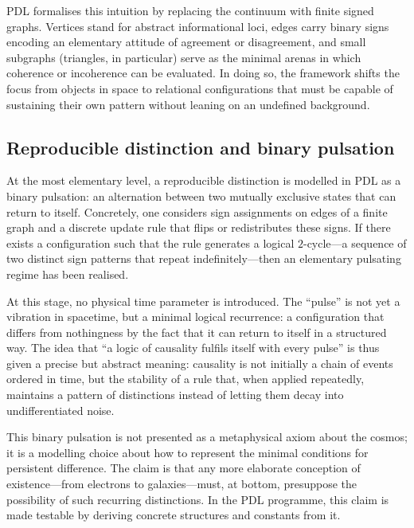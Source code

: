 \documentclass[11pt,a4paper]{article}
\theoremstyle{definition}
\begin{document}
PDL formalises this intuition by replacing the continuum with finite signed graphs. Vertices stand for abstract informational loci, edges carry binary signs encoding an elementary attitude of agreement or disagreement, and small subgraphs (triangles, in particular) serve as the minimal arenas in which coherence or incoherence can be evaluated.\cite{Laubscher_EmergencePhysicalReality_2024,Laubscher_PDL_Position_2024} In doing so, the framework shifts the focus from objects in space to relational configurations that must be capable of sustaining their own pattern without leaning on an undefined background.

\subsection{Reproducible distinction and binary pulsation}

At the most elementary level, a reproducible distinction is modelled in PDL as a binary pulsation: an alternation between two mutually exclusive states that can return to itself.\cite{Laubscher_IntroPDL_2024,Laubscher_Existence_PulsatingClosure_2026} Concretely, one considers sign assignments on edges of a finite graph and a discrete update rule that flips or redistributes these signs. If there exists a configuration such that the rule generates a logical \(2\)-cycle---a sequence of two distinct sign patterns that repeat indefinitely---then an elementary pulsating regime has been realised.

At this stage, no physical time parameter is introduced. The ``pulse'' is not yet a vibration in spacetime, but a minimal logical recurrence: a configuration that differs from nothingness by the fact that it can return to itself in a structured way. The idea that ``a logic of causality fulfils itself with every pulse'' is thus given a precise but abstract meaning: causality is not initially a chain of events ordered in time, but the stability of a rule that, when applied repeatedly, maintains a pattern of distinctions instead of letting them decay into undifferentiated noise.\cite{Laubscher_Existence_PulsatingClosure_2026}

This binary pulsation is not presented as a metaphysical axiom about the cosmos; it is a modelling choice about how to represent the minimal conditions for persistent difference. The claim is that any more elaborate conception of existence---from electrons to galaxies---must, at bottom, presuppose the possibility of such recurring distinctions. In the PDL programme, this claim is made testable by deriving concrete structures and constants from it.\cite{Laubscher_EmergencePhysicalReality_2024,Laubscher_PDL_GlobalMapping_v6_2024}
\end{document}
